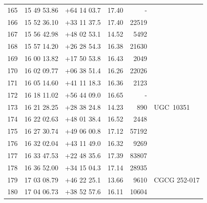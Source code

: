 \documentclass[useAMS,usenatbib]{mn2e}
\begin{document}
\begin{table}
\begin{tabular}{rrrlrl}
 165 &  15 49 53.86 & +64 14 03.7 &  17.40 &      - &                  \\
 166 &  15 52 36.10 & +33 11 37.5 &  17.40 &  22519 &                  \\
 167 &  15 56 42.98 & +48 02 53.1 &  14.52 &   5492 &                  \\
 168 &  15 57 14.20 & +26 28 54.3 &  16.38 &  21630 &                  \\
 169 &  16 00 13.82 & +17 50 53.8 &  16.43 &   2049 &                  \\
 170 &  16 02 09.77 & +06 38 51.4 &  16.26 &  22026 &                  \\
 171 &  16 05 14.60 & +41 11 18.3 &  16.36 &   2123 &                  \\
 172 &  16 18 11.02 & +56 44 09.0 &  16.65 &      - &                  \\
 173 &  16 21 28.25 & +28 38 24.8 &  14.23 &    890 &       UGC~10351  \\
 174 &  16 22 02.63 & +48 01 38.4 &  16.52 &   2448 &                  \\
 175 &  16 27 30.74 & +49 06 00.8 &  17.12 &  57192 &                  \\
 176 &  16 32 02.04 & +43 11 49.0 &  16.32 &   9269 &                  \\
 177 &  16 33 47.53 & +22 48 35.6 &  17.39 &  83807 &                  \\
 178 &  16 36 52.00 & +34 15 04.3 &  17.14 &  28935 &                  \\
 179 &  17 03 08.79 & +46 22 25.1 &  13.66 &   9610 &    CGCG 252-017  \\
 180 &  17 04 06.73 & +38 52 57.6 &  16.11 &  10604 &                  \\
 \hline
\end{tabular}
\end{table}
\end{document}
